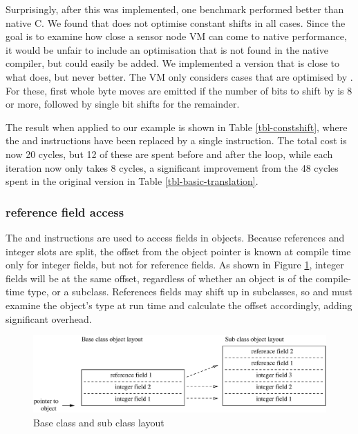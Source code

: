 Surprisingly, after this was implemented, one benchmark performed better than native C. We found that  does not optimise constant shifts in all cases. Since the goal is to examine how close a sensor node VM can come to native performance, it would be unfair to include an optimisation that is not found in the native compiler, but could easily be added. We implemented a version that is close to what  does, but never better. The VM only considers cases that are optimised by . For these, first whole byte moves are emitted if the number of bits to shift by is 8 or more, followed by single bit shifts for the remainder.

The result when applied to our example is shown in Table \ref{tbl-constshift}, where the  and  instructions have been replaced by a single  instruction. The total cost is now 20 cycles, but 12 of these are spent before and after the loop, while each iteration now only takes 8 cycles, a significant improvement from the 48 cycles spent in the original version in Table \ref{tbl-basic-translation}.


\subsubsection{ reference field access}
The  and  instructions are used to access fields in objects. Because references and integer slots are split, the offset from the object pointer is known at compile time only for integer fields, but not for reference fields. As shown in Figure \ref{fig-super-class-sub-class-field-layout}, integer fields will be at the same offset, regardless of whether an object is of the compile-time type, or a subclass. References fields may shift up in subclasses, so  and  must examine the object's type at run time and calculate the offset accordingly, adding significant overhead.

\begin{figure}
\centering
\includegraphics[width=0.7\linewidth]{super-class-sub-class-field-layout.eps}
\caption{Base class and sub class layout}
\label{fig-super-class-sub-class-field-layout}
\end{figure}

